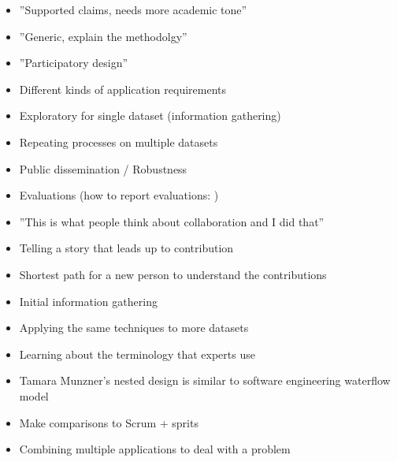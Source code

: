\begin{itemize}
\item ''Supported claims, needs more academic tone''
\item ''Generic, explain the methodolgy''
\item ''Participatory design''
\item Different kinds of application requirements
\item Exploratory for single dataset (information gathering)
\item Repeating processes on multiple datasets
\item Public dissemination / Robustness
\item Evaluations \cite{plaisant2004challenge} (how to report evaluations: \cite{forsell2012guide})
\item ''This is what people think about collaboration and I did that''
\item Telling a story that leads up to contribution 
\item Shortest path for a new person to understand the contributions

\end{itemize}

\begin{itemize}
\item Initial information gathering
\item Applying the same techniques to more datasets
\item Learning about the terminology that experts use
\end{itemize}

\begin{itemize}
\item Tamara Munzner's nested design is similar to software engineering waterflow model
\item Make comparisons to Scrum + sprits
\item Combining multiple applications to deal with a problem \cite{rungta2013manyvis}

\end{itemize}

